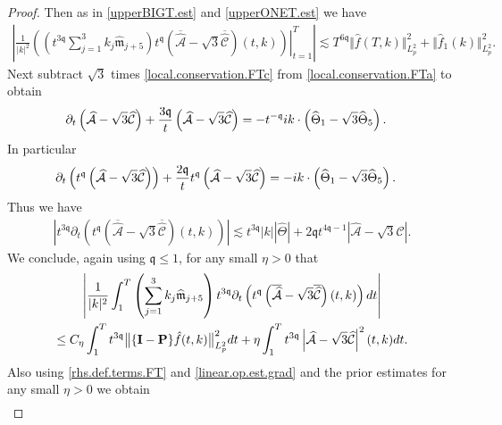 \documentclass[10pt,a4paper]{amsart}
\newcommand{\highG}{\Theta}
\newcommand{\micro}{{\bf \{I- P\}}}
\def\norm#1{\big\Vert#1\big\Vert}
\newcommand{\pv}{p}
\newcommand{\qq}{\mathfrak{q}}
\newcommand{\tTq}{t^{3\qq}}
\newcommand{\tmq}{t^{-\qq}}
\newcommand{\tq}{t^{\qq}}
\begin{document}
\begin{proof}
Then as in \eqref{upperBIGT.est} and \eqref{upperONET.est} we have 
\begin{align*}
    \left|
\left. \frac{1}{|k|^2} \left(  \left(\tTq\sum_{j=1}^3 k_j    \widehat{\mathfrak{m}}_{j+5} \right)\tq\left( \overline{\widehat{\mathcal{A}}}- \sqrt{3}\overline{\widehat{\mathcal{C}}}\right)(t,k) \right)\right|_{t=1}^T
\right|
\lesssim
 T^{6\qq}\Vert \hat{f}(T,k)\Vert_{L^2_{\pv}}^2
 +
 \norm{ \hat{f}_1(k)}_{L^2_{\pv}}^2.
\end{align*}
Next subtract $\sqrt{3}$ times \eqref{local.conservation.FTc} from  \eqref{local.conservation.FTa} to obtain 
\begin{align}\notag
    \partial_t \left( \widehat{\mathcal{A}}-\sqrt{3}\widehat{\mathcal{C}} \right)
+
\frac{3\qq }{t} \left( \widehat{\mathcal{A}}-\sqrt{3}\widehat{\mathcal{C}} \right)
&=-\tmq ik \cdot \left( \widehat{\highG}_{1}-\sqrt{3}\widehat{\highG}_{5} \right).
\end{align}
In particular 
\begin{align}\notag
    \partial_t \left(\tq\left( \widehat{\mathcal{A}}-\sqrt{3}\widehat{\mathcal{C}} \right)\right)
+
\frac{2\qq }{t} \tq \left( \widehat{\mathcal{A}}-\sqrt{3}\widehat{\mathcal{C}} \right)
&=- ik \cdot \left( \widehat{\highG}_{1}-\sqrt{3}\widehat{\highG}_{5} \right).
\end{align}
Thus we have 
\begin{align*}
  \left|  \tTq \partial_t \left(\tq\left( \overline{\widehat{\mathcal{A}}}- \sqrt{3}\overline{\widehat{\mathcal{C}}}\right)(t,k)\right) \right|
 \lesssim 
\tTq |k| \left| \widehat{\highG}\right|
+
2\qq  t^{4\qq -1}\left|{\widehat{\mathcal{A}}}- \sqrt{3}{\widehat{\mathcal{C}}}\right|.
\end{align*}
We conclude, again using $\qq \leq 1$, for any small $\eta>0$ that 
\begin{multline*}
    \left|
\frac{1}{|k|^2} \int_1^{T} \left( \sum_{j=1}^3 k_j    \widehat{\mathfrak{m}}_{j+5} \right) \tTq\partial_t  \left(\tq\left( \overline{\widehat{\mathcal{A}}}- \sqrt{3}\overline{\widehat{\mathcal{C}}}\right)(t,k)\right) dt
\right|
\\
\leq
C_\eta\int_1^{T} \tTq\norm{\micro \hat{f}(t,k)}_{L^2_{\pv}}^2dt
+
\eta \int^{T}_{1} \tTq \left|{\widehat{\mathcal{A}}}- \sqrt{3}{\widehat{\mathcal{C}}}\right|^2(t,k) dt. 
\end{multline*}
Also using \eqref{rhs.def.terms.FT} and \eqref{linear.op.est.grad} and the prior estimates  for any small $\eta>0$ we obtain 
\begin{multline*}

\end{multline*}
\end{proof}
\end{document}

